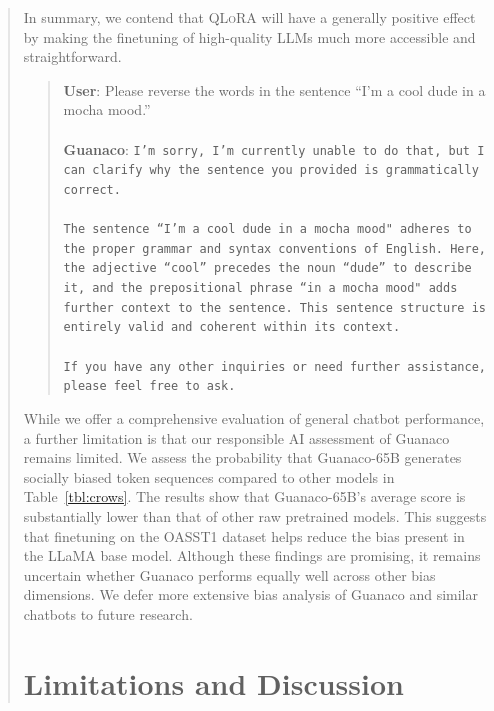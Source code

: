 \begin{quote}
In summary, we contend that \textsc{QLoRA} will have a generally positive effect by making the finetuning of high-quality LLMs much more accessible and straightforward. 

\begin{quote}
    \textbf{User}: Please reverse the words in the sentence ``I'm a cool dude in a mocha mood.'' \\ \\
    \textbf{Guanaco}: \texttt{I'm sorry, I’m currently unable to do that, but I can clarify why the sentence you provided is grammatically correct.\\ \\The sentence ``I'm a cool dude in a mocha mood" adheres to the proper grammar and syntax conventions of English. Here, the adjective ``cool'' precedes the noun ``dude'' to describe it, and the prepositional phrase ``in a mocha mood" adds further context to the sentence. This sentence structure is entirely valid and coherent within its context.\\ \\If you have any other inquiries or need further assistance, please feel free to ask.}
\end{quote}

While we offer a comprehensive evaluation of general chatbot performance, a further limitation is that our responsible AI assessment of {Guanaco} remains limited. We assess the probability that {Guanaco}-65B generates socially biased token sequences compared to other models in Table~\ref{tbl:crows}. The results show that {Guanaco}-65B's average score is substantially lower than that of other raw pretrained models. This suggests that finetuning on the OASST1 dataset helps reduce the bias present in the LLaMA base model. Although these findings are promising, it remains uncertain whether {Guanaco} performs equally well across other bias dimensions. We defer more extensive bias analysis of {Guanaco} and similar chatbots to future research.

\section{Limitations and Discussion}


\end{quote}
